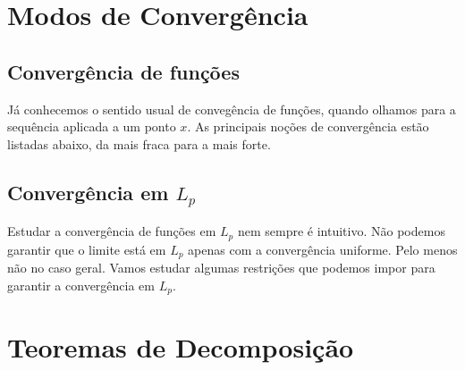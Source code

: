 \rieszFischer









\section{Modos de Convergência}

\subsection{Convergência de funções}

Já conhecemos o sentido usual de convegência de funções, quando olhamos para a sequência aplicada a um ponto $x$. As principais noções de convergência estão listadas abaixo, da mais fraca para a mais forte.

\aeConvergence
\pointwiseConvergence
\uniformConvergence

\subsection{Convergência em \texorpdfstring{$L_p$}{Lp}}

\LpConvergence

Estudar a convergência de funções em $L_p$ nem sempre é intuitivo. Não podemos garantir que o limite está em $L_p$ apenas com a convergência uniforme. Pelo menos não no caso geral. Vamos estudar algumas restrições que podemos impor para garantir a convergência em $L_p$.

\uniformConvergenceLp

\dominatedConvergenceLp

\boundedConvergenceLp









\section{Teoremas de Decomposição}